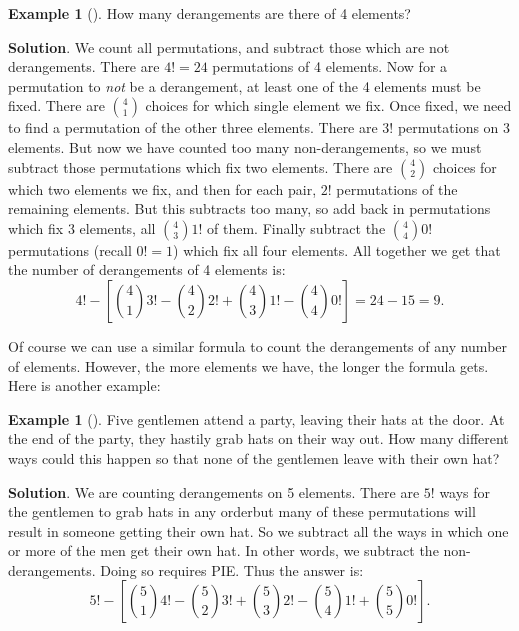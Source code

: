 \documentclass[10pt,]{book}
\theoremstyle{plain}
\theoremstyle{definition}
\theoremstyle{definition}
\newtheorem{example}[theorem]{Example}
\theoremstyle{definition}
\theoremstyle{definition}
\numberwithin{equation}{chapter}
\begin{document}
\begin{example}[]\label{example-14}
\hypertarget{p-869}{}%
How many derangements are there of 4 elements?%
\par\smallskip%
\noindent\textbf{Solution}.\hypertarget{solution-79}{}\quad%
\hypertarget{p-870}{}%
We count all permutations, and subtract those which are not derangements. There are \(4! = 24\) permutations of 4 elements. Now for a permutation to \emph{not} be a derangement, at least one of the 4 elements must be fixed. There are \({4 \choose 1}\) choices for which single element we fix. Once fixed, we need to find a permutation of the other three elements. There are \(3!\) permutations on 3 elements. But now we have counted too many non-derangements, so we must subtract those permutations which fix two elements. There are \({4 \choose 2}\) choices for which two elements we fix, and then for each pair, \(2!\) permutations of the remaining elements. But this subtracts too many, so add back in permutations which fix 3 elements, all \({4 \choose 3}1!\) of them. Finally subtract the \({4 \choose 4}0!\) permutations (recall \(0! = 1\)) which fix all four elements. All together we get that the number of derangements of 4 elements is:%
\begin{equation*}
4! - \left[{4 \choose 1}3! - {4 \choose 2}2! + {4 \choose 3} 1! - {4 \choose 4}0!\right] = 24 - 15 = 9.
\end{equation*}
%
\end{example}
\hypertarget{p-871}{}%
Of course we can use a similar formula to count the derangements of any number of elements. However, the more elements we have, the longer the formula gets. Here is another example:%
\begin{example}[]\label{example-15}
\hypertarget{p-872}{}%
Five gentlemen attend a party, leaving their hats at the door. At the end of the party, they hastily grab hats on their way out. How many different ways could this happen so that none of the gentlemen leave with their own hat?%
\par\smallskip%
\noindent\textbf{Solution}.\hypertarget{solution-80}{}\quad%
\hypertarget{p-873}{}%
We are counting derangements on 5 elements. There are \(5!\) ways for the gentlemen to grab hats in any order\textemdash{}but many of these permutations will result in someone getting their own hat. So we subtract all the ways in which one or more of the men get their own hat. In other words, we subtract the non-derangements. Doing so requires PIE. Thus the answer is:%
\begin{equation*}
5! - \left[{5 \choose 1}4! - {5 \choose 2}3! + {5 \choose 3}2! - {5 \choose 4}1! + {5 \choose 5}0!\right].
\end{equation*}
%
\end{example}
\typeout{************************************************}
\typeout{************************************************}
\end{document}
